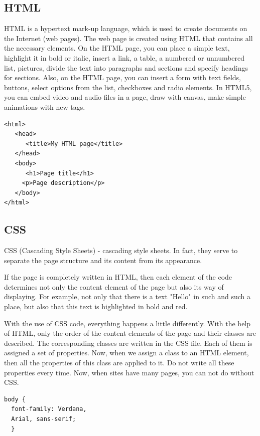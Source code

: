 \subsection{HTML}
HTML is a hypertext mark-up language, which is used to create documents on the Internet (web pages). The web page is created using HTML that contains all the necessary elements. On the HTML page, you can place a simple text, highlight it in bold or italic, insert a link, a table, a numbered or unnumbered list, pictures, divide the text into paragraphs and sections and specify headings for sections. Also, on the HTML page, you can insert a form with text fields, buttons, select options from the list, checkboxes and radio elements. In HTML5, you can embed video and audio files in a page, draw with canvas, make simple animations with new tags. \cite{html}

\begin{verbatim}
<html>
   <head>
      <title>My HTML page</title>
   </head>
   <body>
      <h1>Page title</h1>
     <p>Page description</p>
   </body>
</html>
\end{verbatim}

\subsection{CSS}
CSS (Cascading Style Sheets) - cascading style sheets. In fact, they serve to separate the page structure and its content from its appearance.\par If the page is completely written in HTML, then each element of the code determines not only the content element of the page but also its way of displaying. For example, not only that there is a text "Hello" in such and such a place, but also that this text is highlighted in bold and red.\par With the use of CSS code, everything happens a little differently. With the help of HTML, only the order of the content elements of the page and their classes are described. The corresponding classes are written in the CSS file. Each of them is assigned a set of properties. Now, when we assign a class to an HTML element, then all the properties of this class are applied to it. Do not write all these properties every time. Now, when sites have many pages, you can not do without CSS. \cite{CSS}

\begin{verbatim}
body {
  font-family: Verdana, 
  Arial, sans-serif;
  }
\end{verbatim}

